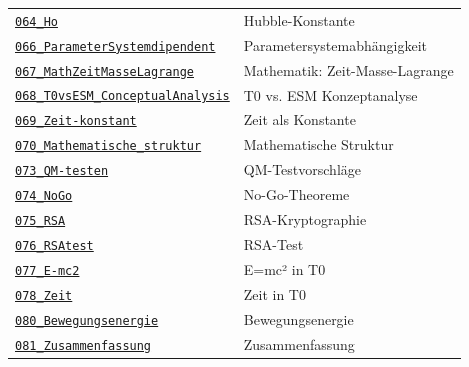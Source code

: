 {\begin{longtable}{@{}>{\raggedright\arraybackslash}p{} >{\raggedright\arraybackslash}p{}@{}}
\href{https://github.com/jpascher/T0-Time-Mass-Duality/blob/main/2/pdf/064_Ho_De.pdf}{\texttt{064\_Ho}} & Hubble-Konstante \\
\href{https://github.com/jpascher/T0-Time-Mass-Duality/blob/main/2/pdf/066_ParameterSystemdipendent_De.pdf}{\texttt{066\_ParameterSystemdipendent}} & Parametersystemabhängigkeit \\
\href{https://github.com/jpascher/T0-Time-Mass-Duality/blob/main/2/pdf/067_MathZeitMasseLagrange_De.pdf}{\texttt{067\_MathZeitMasseLagrange}} & Mathematik: Zeit-Masse-Lagrange \\
\href{https://github.com/jpascher/T0-Time-Mass-Duality/blob/main/2/pdf/068_T0vsESM_ConceptualAnalysis_De.pdf}{\texttt{068\_T0vsESM\_ConceptualAnalysis}} & T0 vs. ESM Konzeptanalyse \\
\href{https://github.com/jpascher/T0-Time-Mass-Duality/blob/main/2/pdf/069_Zeit-konstant_De.pdf}{\texttt{069\_Zeit-konstant}} & Zeit als Konstante \\
\href{https://github.com/jpascher/T0-Time-Mass-Duality/blob/main/2/pdf/070_Mathematische_struktur_De.pdf}{\texttt{070\_Mathematische\_struktur}} & Mathematische Struktur \\
\href{https://github.com/jpascher/T0-Time-Mass-Duality/blob/main/2/pdf/073_QM-testen_De.pdf}{\texttt{073\_QM-testen}} & QM-Testvorschläge \\
\href{https://github.com/jpascher/T0-Time-Mass-Duality/blob/main/2/pdf/074_NoGo_De.pdf}{\texttt{074\_NoGo}} & No-Go-Theoreme \\
\href{https://github.com/jpascher/T0-Time-Mass-Duality/blob/main/2/pdf/075_RSA_De.pdf}{\texttt{075\_RSA}} & RSA-Kryptographie \\
\href{https://github.com/jpascher/T0-Time-Mass-Duality/blob/main/2/pdf/076_RSAtest_De.pdf}{\texttt{076\_RSAtest}} & RSA-Test \\
\href{https://github.com/jpascher/T0-Time-Mass-Duality/blob/main/2/pdf/077_E-mc2_De.pdf}{\texttt{077\_E-mc2}} & E=mc² in T0 \\
\href{https://github.com/jpascher/T0-Time-Mass-Duality/blob/main/2/pdf/078_Zeit_De.pdf}{\texttt{078\_Zeit}} & Zeit in T0 \\
\href{https://github.com/jpascher/T0-Time-Mass-Duality/blob/main/2/pdf/080_Bewegungsenergie_De.pdf}{\texttt{080\_Bewegungsenergie}} & Bewegungsenergie \\
\href{https://github.com/jpascher/T0-Time-Mass-Duality/blob/main/2/pdf/081_Zusammenfassung_De.pdf}{\texttt{081\_Zusammenfassung}} & Zusammenfassung \\

\end{longtable}}
